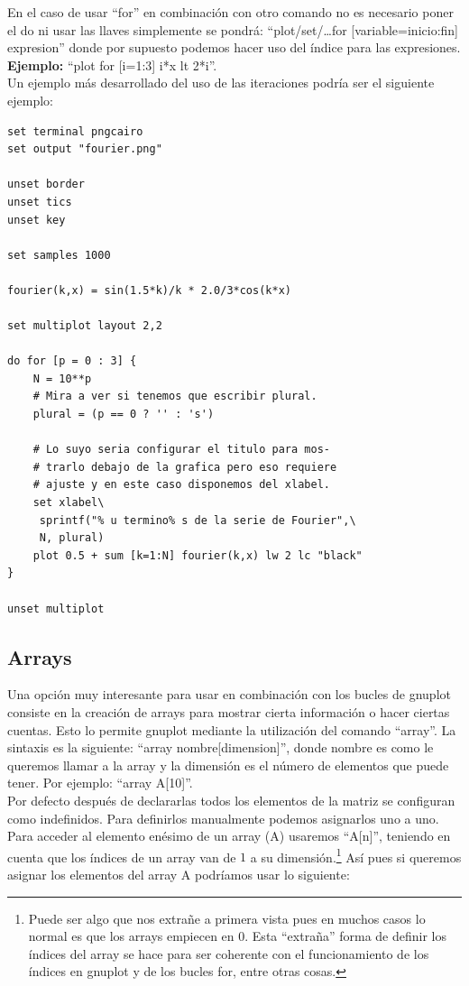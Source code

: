 \documentclass[11pt,a4paper,twoside,pdf]{article}
\numberwithin{equation}{section}
\begin{document}
En el caso de usar ``for'' en combinación con otro comando no es necesario poner el do ni usar las llaves simplemente se pondrá: ``plot/set/\ldots for [variable=inicio:fin] expresion'' donde por supuesto podemos hacer uso del índice para las expresiones. \textbf{Ejemplo:} ``plot for [i=1:3] i*x lt 2*i''. \\

Un ejemplo más desarrollado del uso de las iteraciones podría ser el siguiente ejemplo:

\begin{lstlisting}[language=Gnuplot]
set terminal pngcairo
set output "fourier.png"

unset border
unset tics
unset key

set samples 1000

fourier(k,x) = sin(1.5*k)/k * 2.0/3*cos(k*x)

set multiplot layout 2,2

do for [p = 0 : 3] {
	N = 10**p
	# Mira a ver si tenemos que escribir plural.
	plural = (p == 0 ? '' : 's')

	# Lo suyo seria configurar el titulo para mos-
	# trarlo debajo de la grafica pero eso requiere
	# ajuste y en este caso disponemos del xlabel.
	set xlabel\
	 sprintf("% u termino% s de la serie de Fourier",\
	 N, plural)
	plot 0.5 + sum [k=1:N] fourier(k,x) lw 2 lc "black"
}

unset multiplot
\end{lstlisting}

\subsection{Arrays}

Una opción muy interesante para usar en combinación con los bucles de gnuplot consiste en la creación de arrays para mostrar cierta información o hacer ciertas cuentas. Esto lo permite gnuplot mediante la utilización del comando ``array''. La sintaxis es la siguiente: ``array nombre[dimension]'', donde nombre es como le queremos llamar a la array y la dimensión es el número de elementos que puede tener. Por ejemplo: ``array A[10]''. \\

Por defecto después de declararlas todos los elementos de la matriz se configuran como indefinidos. Para definirlos manualmente podemos asignarlos uno a uno. Para acceder al elemento enésimo de un array (A) usaremos ``A[n]'', teniendo en cuenta que los índices de un array van de $1$ a su dimensión.\footnote{Puede ser algo que nos extrañe a primera vista pues en muchos casos lo normal es que los arrays empiecen en $0$. Esta ``extraña'' forma de definir los índices del array se hace para ser coherente con el funcionamiento de los índices en gnuplot y de los bucles for, entre otras cosas.} Así pues si queremos asignar los elementos del array A podríamos usar lo siguiente:
\end{document}
